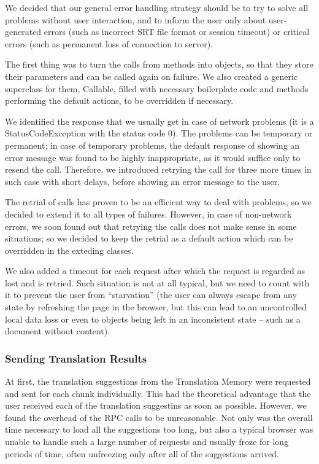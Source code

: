 We decided that our general error handling strategy should be to try to solve all problems without user interaction, and to inform the user only about user-generated errors (such as incorrect SRT file format or session timeout) or critical errors (such as permanent loss of connection to server).

The first thing was to turn the calls from methods into objects, so that they store their parameters and can be called again on failure. We also created a generic superclass for them, Callable, filled with necessary boilerplate code and methods performing the default actions, to be overridden if necessary.

We identified the response that we usually get in case of network problems (it is a StatusCodeException with the status code 0). The problems can be temporary or permanent; in case of temporary problems, the default response of showing an error message was found to be highly inappropriate, as it would suffice only to resend the call. Therefore, we introduced retrying the call for three more times in such case with short delays, before showing an error message to the user.

The retrial of calls has proven to be an efficient way to deal with problems, so we decided to extend it to all types of failures. However, in case of non-network errors, we soon found out that retrying the calls does not make sense in some situations; so we decided to keep the retrial as a default action which can be overridden in the exteding classes.

We also added a timeout for each request after which the request is regarded as lost and is retried. Such situation is not at all typical, but we need to count with it to prevent the user from ``starvation'' (the user can always escape from any state by refreshing the page in the browser, but this can lead to an uncontrolled local data loss or even to objects being left in an inconsistent state -- such as a document without content).

\subsubsection{Sending Translation Results}

At first, the translation suggestions from the Translation Memory were requested and sent for each chunk individually. This had the theoretical advantage that the user received each of the translation suggestins as soon as possible. However, we found the overhead of the RPC calls to be unreasonable. Not only was the overall time necessary to load all the suggestions too long, but also a typical browser was unable to handle such a large number of requests and usually froze for long periods of time, often unfreezing only after all of the suggestions arrived.

